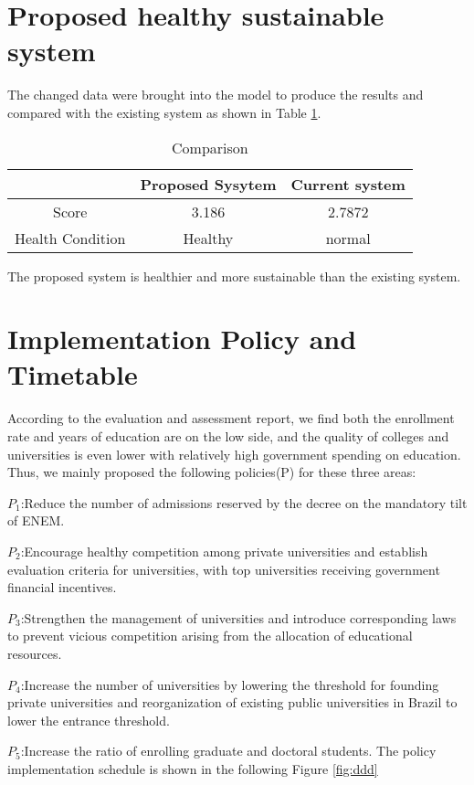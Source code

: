 \documentclass[12pt]{article}  %
\begin{document}
\section {Proposed healthy sustainable system}
The changed data were brought into the model to produce the results and compared with the existing system as shown in Table \ref{tb:zzz}.
\begin{table}[htp]
	\begin{center}
		\caption{Comparison}
		\begin{tabular}{|c|c|c|}
			\hline
			& Proposed Sysytem & Current system \\ \hline
			Score            & 3.186            & 2.7872         \\ \hline
			Health Condition & Healthy          & normal         \\ \hline
		\end{tabular}\label{tb:zzz}
	\end{center}
	\end{table}
		
The proposed system is healthier and more sustainable than the existing system.
\section{Implementation Policy and Timetable}
According to the evaluation and assessment report, we find both the enrollment rate and years of education are on the low side, and the quality of colleges and universities is even lower with relatively high government spending on education. Thus, we mainly proposed the following policies(P) for these three areas:

$P_1$:Reduce the number of admissions reserved by the decree on the mandatory tilt of ENEM.

$P_2$:Encourage healthy competition among private universities and establish evaluation criteria for universities, with top universities receiving government financial incentives.

$P_3$:Strengthen the management of universities and introduce corresponding laws to prevent vicious competition arising from the allocation of educational resources.

$P_4$:Increase the number of universities by lowering the threshold for founding private universities and reorganization of existing public universities in Brazil to lower the entrance threshold.

$P_5$:Increase the ratio of enrolling graduate and doctoral students.
The policy implementation schedule is shown in the following Figure \ref{fig:ddd}
\end{document}
